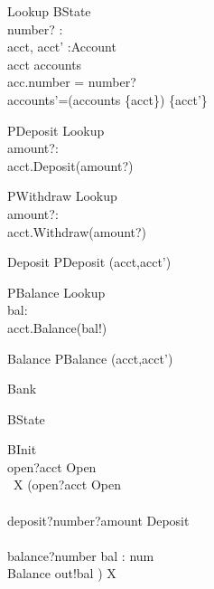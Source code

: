 \documentclass[a4paper,10pt]{article}
\begin{document}
\begin{schema}{Lookup}
 \Delta BState \\
number? : \nat\\
acct, acct' :Account\\
\where
acct \in accounts \\
acc.number = number?\\
accounts'=(accounts \setminus \{acct\}) \cup \{acct'\}\\
\end{schema}


\begin{schema}{PDeposit}
 Lookup\\
 amount?:\nat\\
 \where
 acct.Deposit(amount?)
\end{schema}

\begin{schema}{PWithdraw}
 Lookup\\
 amount?:\nat\\
 \where
 acct.Withdraw(amount?)
\end{schema}


\begin{schema}{Deposit}
 PDeposit \setminus (acct,acct')\\
\end{schema}


\begin{schema}{PBalance}
 Lookup\\
 bal:\nat\\
 \where
 acct.Balance(bal!)
\end{schema}

\begin{schema}{Balance}
 PBalance \setminus (acct,acct') \\
\end{schema}

\begin{circus}
\circprocess Bank \circdef \circbegin\\
\end{circus}

\begin{circusaction}
\circstate BState\\
\end{circusaction}


\begin{circusaction}
\circspot BInit \circseq\\
open?acct \then Open \circseq \\
\circmu~X \circspot (open?acct \then Open\\
\extchoice\\
deposit?number?amount \then Deposit\\
\extchoice\\
balance?number \then \circvar bal : num \\
\circspot Balance \circseq out!bal \then \Skip) \circseq X
\end{circusaction}

\begin{circus}
\circend
\end{circus}
\end{document}
